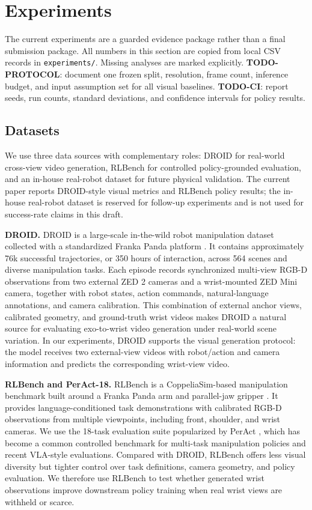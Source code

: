 \documentclass[letterpaper]{article}
\newcommand{\todo}[1]{\textbf{TODO-#1}}
\begin{document}
\section{Experiments}
\label{sec:experiments}

The current experiments are a guarded evidence package rather than a final submission package.
All numbers in this section are copied from local CSV records in \texttt{experiments/}.
Missing analyses are marked explicitly.
\todo{PROTOCOL}: document one frozen split, resolution, frame count, inference budget, and input assumption set for all visual baselines.
\todo{CI}: report seeds, run counts, standard deviations, and confidence intervals for policy results.

\subsection{Datasets}

We use three data sources with complementary roles: DROID for real-world cross-view video generation, RLBench for controlled policy-grounded evaluation, and an in-house real-robot dataset for future physical validation.
The current paper reports DROID-style visual metrics and RLBench policy results; the in-house real-robot dataset is reserved for follow-up experiments and is not used for success-rate claims in this draft.

\textbf{DROID.}
DROID is a large-scale in-the-wild robot manipulation dataset collected with a standardized Franka Panda platform \cite{khazatsky2025droid}.
It contains approximately 76k successful trajectories, or 350 hours of interaction, across 564 scenes and diverse manipulation tasks.
Each episode records synchronized multi-view RGB-D observations from two external ZED 2 cameras and a wrist-mounted ZED Mini camera, together with robot states, action commands, natural-language annotations, and camera calibration.
This combination of external anchor views, calibrated geometry, and ground-truth wrist videos makes DROID a natural source for evaluating exo-to-wrist video generation under real-world scene variation.
In our experiments, DROID supports the visual generation protocol: the model receives two external-view videos with robot/action and camera information and predicts the corresponding wrist-view video.

\textbf{RLBench and PerAct-18.}
RLBench is a CoppeliaSim-based manipulation benchmark built around a Franka Panda arm and parallel-jaw gripper \cite{james2019rlbench}.
It provides language-conditioned task demonstrations with calibrated RGB-D observations from multiple viewpoints, including front, shoulder, and wrist cameras.
We use the 18-task evaluation suite popularized by PerAct \cite{shridhar2023peract}, which has become a common controlled benchmark for multi-task manipulation policies and recent VLA-style evaluations.
Compared with DROID, RLBench offers less visual diversity but tighter control over task definitions, camera geometry, and policy evaluation.
We therefore use RLBench to test whether generated wrist observations improve downstream policy training when real wrist views are withheld or scarce.
\end{document}
